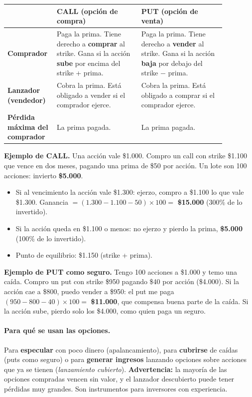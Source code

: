 \begin{center}
\small
\begin{tabular}{|p{0.15\linewidth}|p{0.36\linewidth}|p{0.36\linewidth}|}
\hline
 & \textbf{CALL (opción de compra)} & \textbf{PUT (opción de venta)} \\ \hline
\textbf{Comprador} & Paga la prima. Tiene derecho a \textbf{comprar} al strike. Gana si la
acción \textbf{sube} por encima del strike + prima. & Paga la prima. Tiene derecho a
\textbf{vender} al strike. Gana si la acción \textbf{baja} por debajo del strike $-$ prima. \\
\hline
\textbf{Lanzador (vendedor)} & Cobra la prima. Está obligado a vender si el comprador ejerce. &
Cobra la prima. Está obligado a comprar si el comprador ejerce. \\ \hline
\textbf{Pérdida máxima del comprador} & La prima pagada. & La prima pagada. \\ \hline
\end{tabular}
\end{center}

\begin{recuadro}
\textbf{Ejemplo de CALL.} Una acción vale \$1.000. Compro un call con strike \$1.100 que vence en
dos meses, pagando una prima de \$50 por acción. Un lote son 100 acciones: invierto
\textbf{\$5.000}.
\begin{itemize}[leftmargin=*,nosep]
  \item Si al vencimiento la acción vale \$1.300: ejerzo, compro a \$1.100 lo que vale \$1.300.
        Ganancia $= (1.300 - 1.100 - 50) \times 100 =$ \textbf{\$15.000} (300\% de lo
        invertido).
  \item Si la acción queda en \$1.100 o menos: no ejerzo y pierdo la prima, \textbf{\$5.000}
        (100\% de lo invertido).
  \item Punto de equilibrio: \$1.150 (strike + prima).
\end{itemize}
\textbf{Ejemplo de PUT como seguro.} Tengo 100 acciones a \$1.000 y temo una caída. Compro un put
con strike \$950 pagando \$40 por acción (\$4.000). Si la acción cae a \$800, puedo vender a
\$950: el put me paga $(950 - 800 - 40) \times 100 =$ \textbf{\$11.000}, que compensa buena
parte de la caída. Si la acción sube, pierdo solo los \$4.000, como quien paga un seguro.
\end{recuadro}

\paragraph*{Para qué se usan las opciones.} Para \textbf{especular} con poco dinero
(apalancamiento), para \textbf{cubrirse} de caídas (puts como seguro) o para \textbf{generar
ingresos} lanzando opciones sobre acciones que ya se tienen (\textit{lanzamiento cubierto}).
\textbf{Advertencia:} la mayoría de las opciones compradas vencen sin valor, y el lanzador
descubierto puede tener pérdidas muy grandes. Son instrumentos para inversores con experiencia.

